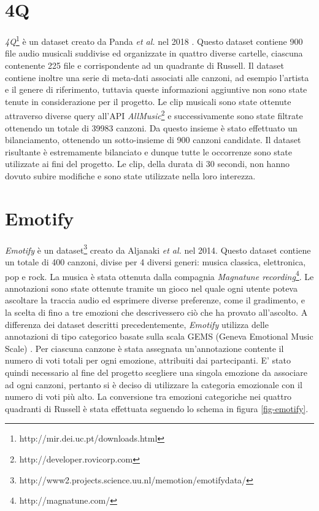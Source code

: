 \documentclass[11pt]{report}
\begin{document}
\section{4Q}
\textit{4Q}\footnote{http://mir.dei.uc.pt/downloads.html} è un dataset creato da Panda \textit{et al.} nel 2018 \cite{panda2018musical}\cite{panda2018novel}. Questo dataset contiene 900 file audio musicali suddivise ed organizzate in quattro diverse cartelle, ciascuna contenente 225 file e corrispondente ad un quadrante di Russell. Il dataset contiene inoltre una serie di meta-dati associati alle canzoni, ad esempio l'artista e il genere di riferimento, tuttavia queste informazioni aggiuntive non sono state tenute in considerazione per il progetto. Le clip musicali sono state ottenute attraverso diverse query all'API \textit{AllMusic}\footnote{http://developer.rovicorp.com} e successivamente sono state filtrate ottenendo un totale di 39983 canzoni. Da questo insieme è stato effettuato un bilanciamento, ottenendo un sotto-insieme di 900 canzoni candidate. Il dataset risultante è estremamente bilanciato e dunque tutte le occorrenze sono state utilizzate ai fini del progetto. Le clip, della durata di 30 secondi, non hanno dovuto subire modifiche e sono state utilizzate nella loro interezza.



\section{Emotify}

\textit{Emotify} è un dataset\footnote{http://www2.projects.science.uu.nl/memotion/emotifydata/} creato da Aljanaki \textit{et al.} nel 2014\cite{aljanaki2014collecting}\cite{aljanaki2016studying}. Questo dataset contiene un totale di 400 canzoni, divise per 4 diversi generi: musica classica, elettronica, pop e rock. La musica è stata ottenuta dalla compagnia \textit{Magnatune recording}\footnote{http://magnatune.com/}. Le annotazioni sono state ottenute tramite un gioco nel quale ogni utente poteva ascoltare la traccia audio ed esprimere diverse preferenze, come il gradimento, e la scelta di fino a tre emozioni che descrivessero ciò che ha provato all'ascolto. A differenza dei dataset descritti precedentemente, \textit{Emotify} utilizza delle annotazioni di tipo categorico basate sulla scala GEMS (Geneva Emotional Music Scale) \cite{zentner2008emotions}. Per ciascuna canzone è stata assegnata un'annotazione contente il numero di voti totali per ogni emozione, attribuiti dai partecipanti. E' stato quindi necessario al fine del progetto scegliere una singola emozione da associare ad ogni canzoni, pertanto si è deciso di utilizzare la categoria emozionale con il numero di voti più alto. La conversione tra emozioni categoriche nei quattro quadranti di Russell è stata effettuata seguendo lo schema in figura \ref{fig-emotify}.
\end{document}
